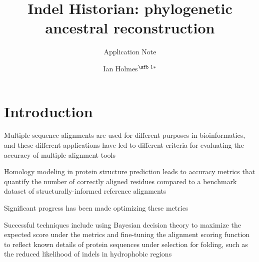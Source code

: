 \documentclass{bioinfo}
\begin{document}

\subtitle{Application Note}

\title[Indel Historian: phylogenetic ancestral reconstruction]{Indel Historian: phylogenetic ancestral reconstruction}
\author[Ian Holmes]{Ian Holmes$^{\text{\sfb 1}*}$}
\address{$^{\text{\sf 1}}$Department of Bioengineering, University of California, Berkeley, 94703, USA.}





\maketitle

\section{Introduction}

Multiple sequence alignments are used for different purposes in bioinformatics,
and these different applications have led to different criteria for evaluating
the accuracy of multiple alignment tools

Homology modeling in protein structure prediction
leads to accuracy metrics that quantify the number of correctly aligned residues
compared to a benchmark dataset of structurally-informed reference alignments

Significant progress has been made optimizing these metrics

Successful techniques include using Bayesian decision theory to maximize the expected
score under the metrics \citep{NotredameEtAl2000,DoEtAl2005,SchwartzPachter2007,BradleyEtAl2009}
and fine-tuning the alignment scoring function to reflect known details of
protein sequences under selection for folding, such as the reduced likelihood of indels in
hydrophobic regions \citep{KatohEtAl2005,Edgar2004b,LarkinEtAl2007}
\end{document}
